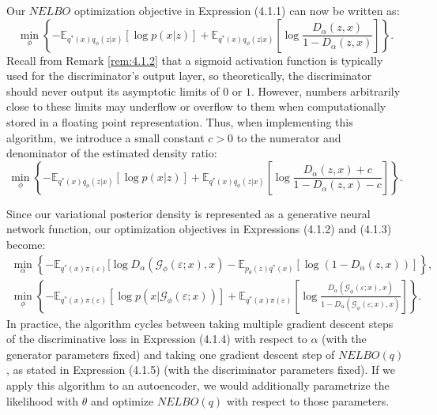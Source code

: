 \documentclass[honours,12pt, twoside]{unswthesis}
\numberwithin{equation}{section}
\theoremstyle{definition}
\begin{document}
Our $NELBO$ optimization objective in Expression (4.1.1) can now be written as:
\begin{equation}
\min_\phi \left\lbrace-\mathbb{E}_{q^*(x)q_\phi(z|x)}[\log p(x|z)]+\mathbb{E}_{q^*(x)q_\phi(z|x)}\left[\log \frac{D_\alpha(z,x)}{1-D_\alpha(z,x)}\right]\right\rbrace.
\end{equation}
Recall from Remark \ref{rem:4.1.2} that a sigmoid activation function is typically used for the discriminator's output layer, so theoretically, the discriminator should never output its asymptotic limits of $0$ or $1$. However, numbers arbitrarily close to these limits may underflow or overflow to them when computationally stored in a floating point representation. Thus, when implementing this algorithm, we introduce a small constant $c>0$ to the numerator and denominator of the estimated density ratio:
\[\min_\phi \left\lbrace-\mathbb{E}_{q^*(x)q_\phi(z|x)}[\log p(x|z)]+\mathbb{E}_{q^*(x)q_\phi(z|x)}\left[\log \frac{D_\alpha(z,x)+c}{1-D_\alpha(z,x)-c}\right]\right\rbrace.\]

Since our variational posterior density is represented as a generative neural network function, our optimization objectives in Expressions (4.1.2) and (4.1.3) become:
\begin{align}
\min_\alpha \left\lbrace-\mathbb{E}_{q^*(x)\pi(\varepsilon)}[\log D_\alpha(\mathcal{G}_\phi(\varepsilon;x),x)-\mathbb{E}_{p_\theta(z)q^*(x)}[\log (1-D_\alpha(z,x))]\right\rbrace,\\
\min_\phi \left\lbrace-\mathbb{E}_{q^*(x)\pi (\varepsilon)}[\log p(x|\mathcal{G}_\phi(\varepsilon;x))]+\mathbb{E}_{q^*(x)\pi(\varepsilon)}\left[\log \frac{D_\alpha(\mathcal{G}_\phi(\varepsilon;x),x)}{1-D_\alpha(\mathcal{G}_\phi(\varepsilon;x),x)}\right]\right\rbrace.
\end{align}
In practice, the algorithm cycles between taking multiple gradient descent steps of the discriminative loss in Expression (4.1.4) with respect to $\alpha$ (with the generator parameters fixed) and taking one gradient descent step of $NELBO(q)$, as stated in Expression (4.1.5) (with the discriminator parameters fixed). If we apply this algorithm to an autoencoder, we would additionally parametrize the likelihood with $\theta$ and optimize $NELBO(q)$ with respect to those parameters.
\end{document}
